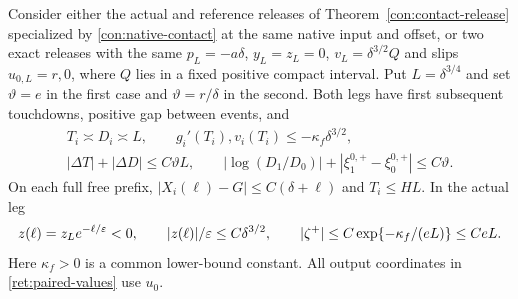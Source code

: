 \begin{lemma}
\label{lem:paired-free-normalization}
Consider either the actual and reference releases of
Theorem~\ref{con:contact-release} specialized by
\eqref{con:native-contact} at the same native input and offset,
or two exact releases with the same
$p_L=-a\delta$, $y_L=z_L=0$, $v_L=\delta^{3/2}Q$ and slips
$u_{0,L}=r,0$, where $Q$ lies in a fixed positive compact interval.
Put $L=\delta^{3/4}$ and set $\vartheta=e$ in the first case and
$\vartheta=r/\delta$ in the second. Both legs have first subsequent
touchdowns, positive gap between events, and
\begin{equation}
 \begin{gathered}
 T_i\asymp D_i\asymp L,\qquad
 g_i'(T_i),v_i(T_i)\le-\kappa_f\delta^{3/2},\\
 |\Delta T|+|\Delta D|\le C\vartheta L,\qquad
 |\log(D_1/D_0)|+|\xi_1^{0,+}-\xi_0^{0,+}|\le C\vartheta.
 \end{gathered}\label{ret:paired-values}
\end{equation}
On each full free prefix, $|X_i(\ell)-G|\le C(\delta+\ell)$ and
$T_i\le HL$. In the actual leg
\begin{equation}
 z(\ell)=z_Le^{-\ell/\varepsilon}<0,\qquad
 |z(\ell)|/\varepsilon\le C\delta^{3/2},\qquad
 |\zeta^+|\le C\exp\{-\kappa_f/(eL)\}\le CeL.
 \label{ret:free-memory}
\end{equation}
Here $\kappa_f>0$ is a common lower-bound constant. All output
coordinates in \eqref{ret:paired-values} use $u_0$.
\end{lemma}

